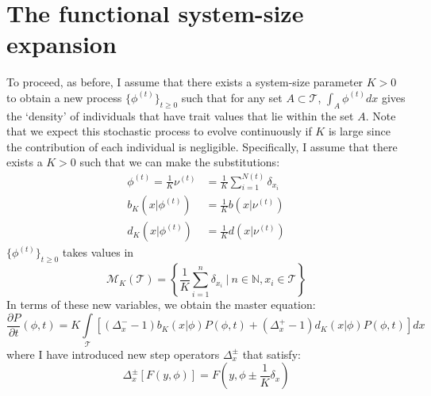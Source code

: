 \section{The functional system-size expansion}

To proceed, as before, I assume that there exists a system-size parameter $K > 0$ to obtain a new process $\{\phi^{(t)}\}_{t \geq 0}$ such that for any set $A \subset \mathcal{T}$, $\int_A\phi^{(t)}dx$ gives the `density' of individuals that have trait values that lie within the set $A$. Note that we expect this stochastic process to evolve continuously if $K$ is large since the contribution of each individual is negligible. Specifically, I assume that there exists a $K>0$ such that we can make the substitutions:
\begin{align*}
    \phi^{(t)} = \frac{1}{K}\nu^{(t)} &= \frac{1}{K}\sum\limits_{i=1}^{N(t)}\delta_{x_i}\\
    b_K(x|\phi^{(t)}) &= \frac{1}{K}b(x|\nu^{(t)})\\
    d_K(x|\phi^{(t)}) &= \frac{1}{K}d(x|\nu^{(t)})
\end{align*}
$\{\phi^{(t)}\}_{t\geq0}$ takes values in 
\begin{equation*}
    \mathcal{M}_{K}(\mathcal{T}) = \left\{\frac{1}{K}\sum\limits_{i=1}^{n}\delta_{x_i} \ | \ n \in \mathbb{N}, x_i \in \mathcal{T}\right\}
\end{equation*}
In terms of these new variables, we obtain the master equation:
\begin{equation}
\label{M_equation}
    \frac{\partial P}{\partial t}(\phi,t) = K\int\limits_{\mathcal{T}}\left[(\Delta^{-}_{x}-1)b_K(x|\phi)P(\phi,t) +(\Delta^{+}_{x}-1)d_K(x|\phi)P(\phi,t)\right]dx
\end{equation}
where I have introduced new step operators $\Delta_{x}^{\pm}$ that satisfy:
\begin{equation*}
    \Delta_{x}^{\pm}[F(y,\phi)] =  F\left(y,\phi \pm \frac{1}{K}\delta_x\right)
\end{equation*}



